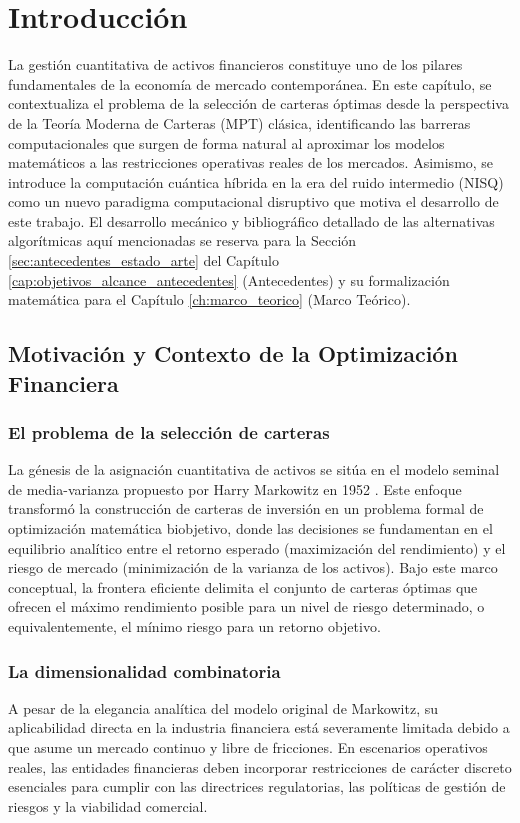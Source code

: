 \chapter{Introducción}
\label{ch:introduccion}

La gestión cuantitativa de activos financieros constituye uno de los pilares fundamentales de la economía de mercado contemporánea. En este capítulo, se contextualiza el problema de la selección de carteras óptimas desde la perspectiva de la Teoría Moderna de Carteras (MPT) clásica, identificando las barreras computacionales que surgen de forma natural al aproximar los modelos matemáticos a las restricciones operativas reales de los mercados. Asimismo, se introduce la computación cuántica híbrida en la era del ruido intermedio (NISQ) como un nuevo paradigma computacional disruptivo que motiva el desarrollo de este trabajo. El desarrollo mecánico y bibliográfico detallado de las alternativas algorítmicas aquí mencionadas se reserva para la Sección \ref{sec:antecedentes_estado_arte} del Capítulo \ref{cap:objetivos_alcance_antecedentes} (Antecedentes) y su formalización matemática para el Capítulo \ref{ch:marco_teorico} (Marco Teórico).

\section{Motivación y Contexto de la Optimización Financiera}
\label{sec:motivacion_contexto}

\subsection{El problema de la selección de carteras}
La génesis de la asignación cuantitativa de activos se sitúa en el modelo seminal de media-varianza propuesto por Harry Markowitz en 1952 \cite{Markowitz1952}. Este enfoque transformó la construcción de carteras de inversión en un problema formal de optimización matemática biobjetivo, donde las decisiones se fundamentan en el equilibrio analítico entre el retorno esperado (maximización del rendimiento) y el riesgo de mercado (minimización de la varianza de los activos). Bajo este marco conceptual, la frontera eficiente delimita el conjunto de carteras óptimas que ofrecen el máximo rendimiento posible para un nivel de riesgo determinado, o equivalentemente, el mínimo riesgo para un retorno objetivo.

\subsection{La dimensionalidad combinatoria}
A pesar de la elegancia analítica del modelo original de Markowitz, su aplicabilidad directa en la industria financiera está severamente limitada debido a que asume un mercado continuo y libre de fricciones. En escenarios operativos reales, las entidades financieras deben incorporar restricciones de carácter discreto esenciales para cumplir con las directrices regulatorias, las políticas de gestión de riesgos y la viabilidad comercial.

